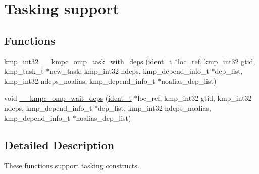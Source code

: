 \hypertarget{group__TASKING}{\section{Tasking support}
\label{group__TASKING}
}
\subsection*{Functions}
\begin{DoxyCompactItemize}
\item 
kmp\-\_\-int32 \hyperlink{group__TASKING_ga8b2a95073f7a4a81055899ee6a93ecee}{\-\_\-\-\_\-kmpc\-\_\-omp\-\_\-task\-\_\-with\-\_\-deps} (\hyperlink{group__BASIC__TYPES_ga690fda6b92f039a72db263c6b4394ddb}{ident\-\_\-t} $\ast$loc\-\_\-ref, kmp\-\_\-int32 gtid, kmp\-\_\-task\-\_\-t $\ast$new\-\_\-task, kmp\-\_\-int32 ndeps, kmp\-\_\-depend\-\_\-info\-\_\-t $\ast$dep\-\_\-list, kmp\-\_\-int32 ndeps\-\_\-noalias, kmp\-\_\-depend\-\_\-info\-\_\-t $\ast$noalias\-\_\-dep\-\_\-list)
\item 
void \hyperlink{group__TASKING_gab53273918f995639450c4dcbed02df88}{\-\_\-\-\_\-kmpc\-\_\-omp\-\_\-wait\-\_\-deps} (\hyperlink{group__BASIC__TYPES_ga690fda6b92f039a72db263c6b4394ddb}{ident\-\_\-t} $\ast$loc\-\_\-ref, kmp\-\_\-int32 gtid, kmp\-\_\-int32 ndeps, kmp\-\_\-depend\-\_\-info\-\_\-t $\ast$dep\-\_\-list, kmp\-\_\-int32 ndeps\-\_\-noalias, kmp\-\_\-depend\-\_\-info\-\_\-t $\ast$noalias\-\_\-dep\-\_\-list)
\end{DoxyCompactItemize}


\subsection{Detailed Description}
These functions support tasking constructs. 

